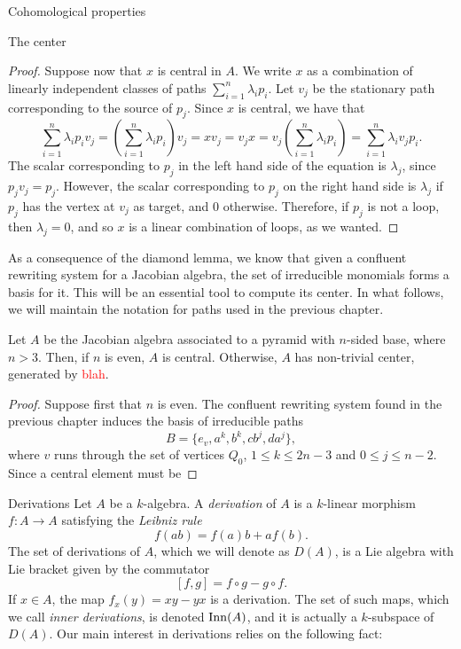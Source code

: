 \begin{chapter}{Cohomological properties}
\begin{section}{The center}
\begin{proof}
Suppose now that $x$ is central in $A$. We write $x$ as a combination of linearly independent classes of paths $\sum_{i=1}^n \lambda_i p_i$. Let $v_j$ be the stationary path corresponding to the source of $p_j$. Since $x$ is central, we have that
\[\sum_{i=1}^n \lambda_i p_iv_j=(\sum_{i=1}^n \lambda_i p_i)v_j = xv_j=v_jx = v_j(\sum_{i=1}^n \lambda_i p_i)=\sum_{i=1}^n \lambda_i v_jp_i.\]
The scalar corresponding to $p_j$ in the left hand side of the equation is $\lambda_j$, since $p_jv_j=p_j$. However, the scalar corresponding to $p_j$ on the right hand side is $\lambda_j$ if $p_j$ has the vertex at $v_j$ as target, and 0 otherwise. Therefore, if $p_j$ is not a loop, then $\lambda_j=0$, and so $x$ is a linear combination of loops, as we wanted.
\end{proof}

As a consequence of the diamond lemma, we know that given a confluent rewriting system for a Jacobian algebra, the set of irreducible monomials forms a basis for it. This will be an essential tool to compute its center. In what follows, we will maintain the notation for paths used in the previous chapter.

\begin{prop} Let $A$ be the Jacobian algebra associated to a pyramid with $n$-sided base, where $n>3$. Then, if $n$ is even, $A$ is central. Otherwise, $A$ has non-trivial center, generated by \textcolor{red}{blah}.
\end{prop}
\begin{proof} Suppose first that $n$ is even. The confluent rewriting system found in the previous chapter induces the basis of irreducible paths 
\[B=\{e_v,a^k,b^k,cb^j, da^j\},\] 
where $v$ runs through the set of vertices $Q_0$, $1\leq k\leq 2n-3$ and $0\leq j\leq n-2$. Since a central element must be 
\end{proof}
\end{section}

\begin{section}{Derivations}
Let $A$ be a $k$-algebra. A \emph{derivation} of $A$ is a $k$-linear morphism $f:A\to A$ satisfying the \emph{Leibniz rule}
\[f(ab)=f(a)b+af(b).\]
The set of derivations of $A$, which we will denote as $D(A)$, is a Lie algebra with Lie bracket given by the commutator
\[[f,g] = f\circ g - g\circ f.\]
If $x\in A$, the map $f_x(y) = xy-yx$ is a derivation. The set of such maps, which we call \emph{inner derivations}, is denoted $\operatorname{Inn}(A)$, and it is actually a $k$-subspace of $D(A)$. Our main interest in derivations relies on the following fact:


\end{section}
\end{chapter}
